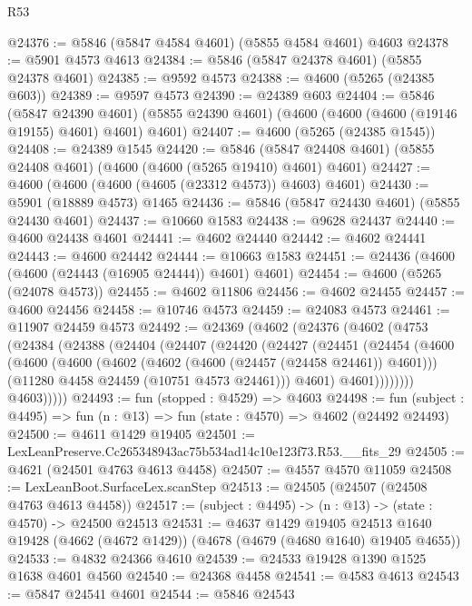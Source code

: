 \begin{lexlean}{R53}
\begin{coremodule}
@24376 := @5846 (@5847 @4584 @4601) (@5855 @4584 @4601) @4603
@24378 := @5901 @4573 @4613
@24384 := @5846 (@5847 @24378 @4601) (@5855 @24378 @4601)
@24385 := @9592 @4573
@24388 := @4600 (@5265 (@24385 @603))
@24389 := @9597 @4573
@24390 := @24389 @603
@24404 := @5846
    (@5847 @24390 @4601)
    (@5855 @24390 @4601)
    (@4600 (@4600 (@4600 (@19146 @19155) @4601) @4601) @4601)
@24407 := @4600 (@5265 (@24385 @1545))
@24408 := @24389 @1545
@24420 := @5846 (@5847 @24408 @4601) (@5855 @24408 @4601) (@4600 (@4600 (@5265 @19410) @4601) @4601)
@24427 := @4600 (@4600 (@4600 (@4605 (@23312 @4573)) @4603) @4601)
@24430 := @5901 (@18889 @4573) @1465
@24436 := @5846 (@5847 @24430 @4601) (@5855 @24430 @4601)
@24437 := @10660 @1583
@24438 := @9628 @24437
@24440 := @4600 @24438 @4601
@24441 := @4602 @24440
@24442 := @4602 @24441
@24443 := @4600 @24442
@24444 := @10663 @1583
@24451 := @24436 (@4600 (@4600 (@24443 (@16905 @24444)) @4601) @4601)
@24454 := @4600 (@5265 (@24078 @4573))
@24455 := @4602 @11806
@24456 := @4602 @24455
@24457 := @4600 @24456
@24458 := @10746 @4573
@24459 := @24083 @4573
@24461 := @11907 @24459 @4573
@24492 := @24369
    (@4602
      (@24376
        (@4602
          (@4753
            (@24384
              (@24388
                (@24404
                  (@24407
                    (@24420
                      (@24427
                        (@24451
                          (@24454
                            (@4600
                              (@4600
                                (@4600
                                  (@4602 (@4602 (@4600 (@24457 (@24458 @24461)) @4601)))
                                  (@11280 @4458 @24459 (@10751 @4573 @24461)))
                                @4601)
                              @4601))))))))
              @4603)))))
@24493 := fun (stopped : @4529) => @4603
@24498 := fun (subject : @4495) => fun (n : @13) => fun (state : @4570) => @4602 (@24492 @24493)
@24500 := @4611 @1429 @19405
@24501 := LexLeanPreserve.Cc265348943ac75b534ad14c10e123f73.R53.__fits_29
@24505 := @4621 (@24501 @4763 @4613 @4458)
@24507 := @4557 @4570 @11059
@24508 := LexLeanBoot.SurfaceLex.scanStep
@24513 := @24505 (@24507 (@24508 @4763 @4613 @4458))
@24517 := (subject : @4495) -> (n : @13) -> (state : @4570) -> @24500 @24513
@24531 := @4637
    @1429
    @19405
    @24513
    @1640
    @19428
    (@4662 (@4672 @1429))
    (@4678 (@4679 (@4680 @1640) @19405 @4655))
@24533 := @4832 @24366 @4610
@24539 := @24533 @19428 @1390 @1525 @1638 @4601 @4560
@24540 := @24368 @4458
@24541 := @4583 @4613
@24543 := @5847 @24541 @4601
@24544 := @5846 @24543

\end{coremodule}
\end{lexlean}
